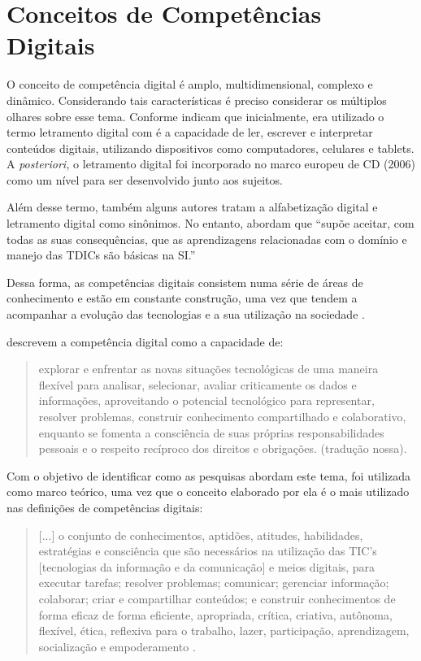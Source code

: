 \documentclass[portuguese]{textolivre}
\begin{document}
\section{Conceitos de Competências Digitais}
O conceito de competência digital é amplo, multidimensional, complexo e
dinâmico. Considerando tais características é preciso considerar os
múltiplos olhares sobre esse tema. Conforme \textcite{silva2019a} indicam
que inicialmente, era utilizado o termo letramento digital com é a
capacidade de ler, escrever e interpretar conteúdos digitais, utilizando
dispositivos como computadores, celulares e tablets. A \emph{posteriori,
}o letramento digital foi incorporado no marco europeu de CD (2006) como
um nível para ser desenvolvido junto aos sujeitos.

Além desse termo, também alguns autores tratam a alfabetização digital e
letramento digital como sinônimos. No entanto, \textcite{silva2019a}
abordam que ``supõe aceitar, com todas as suas consequências, que as
aprendizagens relacionadas com o domínio e manejo das TDICs são básicas
na SI.'' \cite[s.p.]{silva2019a}

Dessa forma, as competências digitais consistem numa série de áreas de
conhecimento e estão em constante construção, uma vez que tendem a
acompanhar a evolução das tecnologias e a sua utilização na sociedade
\cite{ferrari2013}.

\textcite[p.~186]{calvani2009} descrevem a competência digital
como a capacidade de:
\begin{quote}
explorar e enfrentar as novas situações tecnológicas de uma maneira
flexível para analisar, selecionar, avaliar criticamente os dados e
informações, aproveitando o potencial tecnológico para representar,
resolver problemas, construir conhecimento compartilhado e colaborativo,
enquanto se fomenta a consciência de suas próprias responsabilidades
pessoais e o respeito recíproco dos direitos e obrigações. (tradução
nossa).
\end{quote}

Com o objetivo de identificar como as pesquisas abordam este tema,
\textcite{ferrari2012} foi utilizada como marco teórico, uma vez que o conceito
elaborado por ela é o mais utilizado nas definições de competências
digitais:
\begin{quote}
{[}...{]} o conjunto de conhecimentos, aptidões, atitudes, habilidades,
estratégias e consciência que são necessários na utilização das TIC's
{[}tecnologias da informação e da comunicação{]} e meios digitais, para
executar tarefas; resolver problemas; comunicar; gerenciar informação;
colaborar; criar e compartilhar conteúdos; e construir conhecimentos de
forma eficaz de forma eficiente, apropriada, crítica, criativa,
autônoma, flexível, ética, reflexiva para o trabalho, lazer,
participação, aprendizagem, socialização e empoderamento \cite[p.~3-4, tradução nossa]{ferrari2012}.
\end{quote}
\end{document}
